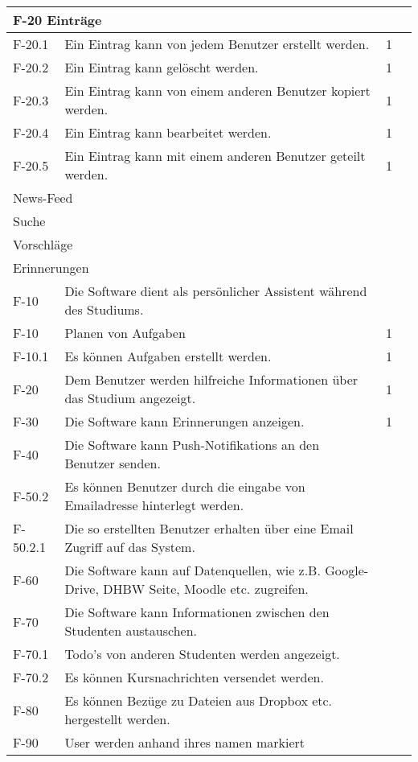 \begin{tabularx}{\textwidth}{|l|X|l|l|}
    \hline
    \multicolumn{4}{|l|}{F-20 Einträge}\\
    \hline
    F-20.1 & Ein Eintrag kann von jedem Benutzer erstellt werden. & 1 & \\
    F-20.2 & Ein Eintrag kann gelöscht werden. & 1 & \\
    F-20.3 & Ein Eintrag kann von einem anderen Benutzer kopiert werden. & 1 & \\
    F-20.4 & Ein Eintrag kann bearbeitet werden. & 1 & \\
    F-20.5 & Ein Eintrag kann mit einem anderen Benutzer geteilt werden. & 1 & \\
    \hline
    \multicolumn{4}{|l|}{News-Feed}\\
    \hline
    \multicolumn{4}{|l|}{Suche}\\
    \hline
    \multicolumn{4}{|l|}{Vorschläge}\\
    \hline
    \multicolumn{4}{|l|}{Erinnerungen}\\
    \hline

    F-10 & Die Software dient als persönlicher Assistent während des Studiums. & & \\
    F-10 & Planen von Aufgaben & 1 & \\
    F-10.1 & Es können Aufgaben erstellt werden. & 1 & \\

    F-20 & Dem Benutzer werden hilfreiche Informationen über das Studium angezeigt. & 1 & \\

    F-30 & Die Software kann Erinnerungen anzeigen. & 1 & \\

    F-40 & Die Software kann Push-Notifikations an den Benutzer senden. & & \\

    F-50.2 & Es können Benutzer durch die eingabe von Emailadresse hinterlegt werden. & & \\
    F-50.2.1 & Die so erstellten Benutzer erhalten über eine Email Zugriff auf das System. & & \\ %
    
    F-60 & Die Software kann auf Datenquellen, wie z.B. Google-Drive, DHBW Seite, Moodle etc. zugreifen. & & \\

    F-70 & Die Software kann Informationen zwischen den Studenten austauschen. & & \\
    F-70.1 & Todo's von anderen Studenten werden angezeigt. & &\\
    F-70.2 & Es können Kursnachrichten versendet werden. & &\\
    F-80 & Es können Bezüge zu Dateien aus Dropbox etc. hergestellt werden. & &\\
    F-90 & User werden anhand ihres namen markiert & &\\ %


\end{tabularx}
